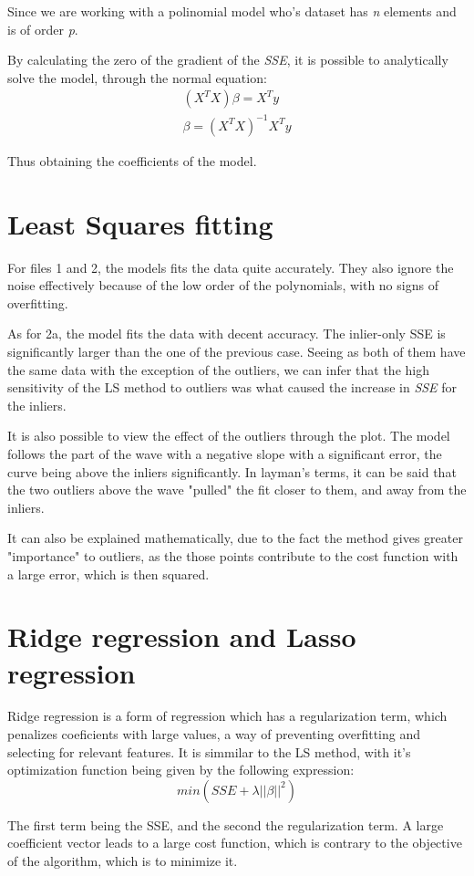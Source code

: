 \documentclass[a4paper,2pt]{report}
\begin{document}
    \par Since we are working with a polinomial model who's dataset has \textit{n} elements and is of order \textit{p}.
    \par By calculating the zero of the gradient of the \textit{SSE}, it is possible to analytically solve the model, through the normal equation:
    \begin{align*}
        (X^T X)\beta = X^T y\\
        \beta = (X^T X)^{-1} X^T y
    \end{align*}
    \par Thus obtaining the coefficients of the model.

\section{Least Squares fitting}
    \par For files 1 and 2, the models fits the data quite accurately. They also ignore the noise effectively because of the low order of the polynomials, with no signs of overfitting.
    \par As for 2a, the model fits the data with decent accuracy. The inlier-only SSE is significantly larger than the one of the previous case. Seeing as both of them have the same data with the exception of the outliers, we can infer that the high sensitivity of the LS method to outliers was what caused the increase in \textit{SSE} for the inliers. 
    \par It is also possible to view the effect of the outliers through the plot. The model follows the part of the wave with a negative slope with a significant error, the curve being above the inliers significantly. In layman's terms, it can be said that the two outliers above the wave "pulled" the fit closer to them, and away from the inliers.
    \par It can also be explained mathematically, due to the fact the method gives greater "importance" to outliers, as the those points contribute to the cost function with a large error, which is then squared.

\section{Ridge regression and Lasso regression}

    \par Ridge regression is a form of regression which has a regularization term, which penalizes coeficients with large values, a way of preventing overfitting and selecting for relevant features. It is simmilar to the LS method, with it's optimization function being given by the following expression:
    \begin{equation}
        min(SSE + \lambda||\beta||^2)
    \end{equation}
    \par The first term being the SSE, and the second the regularization term. A large coefficient vector leads to a large cost function, which is contrary to the objective of the algorithm, which is to minimize it.
\end{document}
